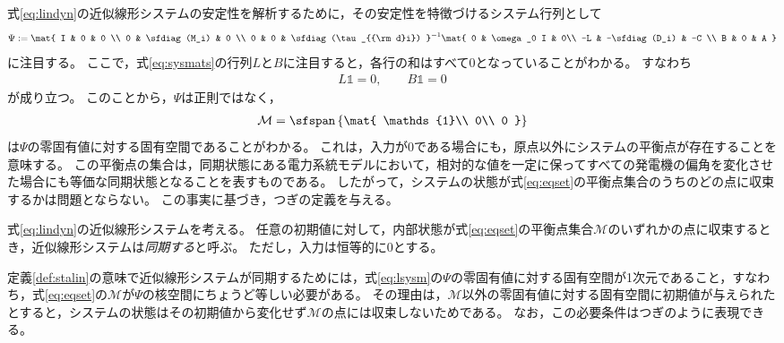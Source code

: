 \documentclass[tombow,dvipdfmx]{corona-a5}
\begin{document}
式\ref{eq:lindyn}の近似線形システムの安定性を解析するために，その安定性を特徴づけるシステム行列として
\begin{align}\label{eq:lsysm}
\Psi :=
\mat{
I & 0 & 0 \\
0 & \sfdiag(M_i) & 0 \\
0 & 0 & \sfdiag(\tau_{{\rm d}i}) 
}^{-1}
\mat{
0 & \omega_0 I & 0\\
 -L & -\sfdiag(D_i) & -C \\
 B & 0 & A
 }
\end{align}
に注目する。
ここで，式\ref{eq:sysmats}の行列$L$と$B$に注目すると，各行の和はすべて0となっていることがわかる。
すなわち
\begin{align}\label{eq:LBker}
L  \mathds{1} = 0
,\qquad
 B  \mathds{1} =0
\end{align}
が成り立つ。
このことから，$\Psi$は正則ではなく，
\begin{align}\label{eq:eqset}
\mathcal{M} =
 \sfspan\left\{
 \mat{
 \mathds{1}\\
 0\\
 0
 }
 \right\}
\end{align}
は$\Psi$の零固有値に対する固有空間であることがわかる。
これは，入力が0である場合にも，原点以外にシステムの平衡点が存在することを意味する。
この平衡点の集合は，同期状態にある電力系統モデルにおいて，相対的な値を一定に保ってすべての発電機の偏角を変化させた場合にも等価な同期状態となることを表すものである。
したがって，システムの状態が式\ref{eq:eqset}の平衡点集合のうちのどの点に収束するかは問題とならない。
この事実に基づき，つぎの定義を与える。

\begin{定義}\label{def:stalin}
式\ref{eq:lindyn}の近似線形システムを考える。
任意の初期値に対して，内部状態が式\ref{eq:eqset}の平衡点集合$\mathcal{M}$のいずれかの点に収束するとき，近似線形システムは\emph{同期する}と呼ぶ。
ただし，入力は恒等的に0とする。
\end{定義}

定義\ref{def:stalin}の意味で近似線形システムが同期するためには，式\ref{eq:lsysm}の$\Psi$の零固有値に対する固有空間が1次元であること，すなわち，式\ref{eq:eqset}の$\mathcal{M}$が$\Psi$の核空間にちょうど等しい必要がある。
その理由は，$\mathcal{M}$以外の零固有値に対する固有空間に初期値が与えられたとすると，システムの状態はその初期値から変化せず$\mathcal{M}$の点には収束しないためである。
なお，この必要条件はつぎのように表現できる。
\end{document}
